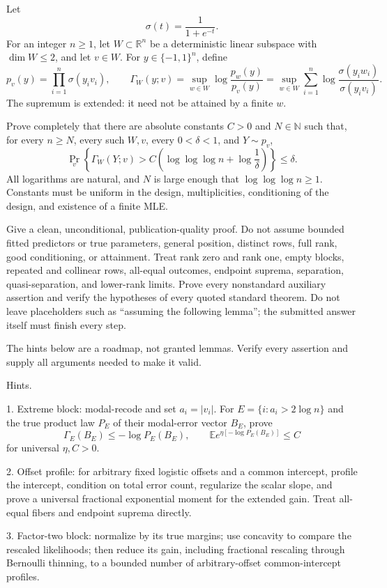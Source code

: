 \documentclass[11pt, letterpaper, hidelinks]{article}
\newcommand{\1}{\mathbf 1}
\let\subseteq\subset
\renewcommand{\le}{\leqslant}
\renewcommand{\ge}{\geqslant}
\theoremstyle{plain}
\theoremstyle{definition}
\begin{document}
\newpage
\begin{promptbox}
Let
\[
\sigma(t)=\frac1{1+e^{-t}}.
\]
For an integer \(n\ge1\), let \(W\subseteq\mathbb R^n\) be a deterministic linear
subspace with \(\dim W\le2\), and let \(v\in W\). For
\(y\in\{-1,1\}^n\), define
\[
p_v(y)=\prod_{i=1}^n\sigma(y_iv_i),\qquad
\Gamma_W(y;v)=\sup_{w\in W}\log\frac{p_w(y)}{p_v(y)}
=\sup_{w\in W}\sum_{i=1}^n
\log\frac{\sigma(y_iw_i)}{\sigma(y_iv_i)}.
\]
The supremum is extended: it need not be attained by a finite \(w\).

Prove completely that there are absolute constants \(C>0\) and \(N\in\mathbb N\)
such that, for every \(n\ge N\), every such \(W,v\), every \(0<\delta<1\), and
\(Y\sim p_v\),
\[
\Pr_v\!\left\{\Gamma_W(Y;v)>
C\left(\log\log\log n+\log\frac1\delta\right)\right\}\le\delta .
\]
All logarithms are natural, and \(N\) is large enough that
\(\log\log\log n\ge1\). Constants must be uniform in the design, multiplicities,
conditioning of the design, and existence of a finite MLE.

Give a clean, unconditional, publication-quality proof. Do not assume bounded fitted
predictors or true parameters, general position, distinct rows, full rank, good
conditioning, or attainment. Treat rank zero and rank one, empty blocks, repeated
and collinear rows, all-equal outcomes, endpoint suprema, separation,
quasi-separation, and lower-rank limits. Prove every nonstandard auxiliary assertion
and verify the hypotheses of every quoted standard theorem. Do not leave
placeholders such as “assuming the following lemma”; the submitted answer itself
must finish every step.

The hints below are a roadmap, not granted lemmas. Verify every assertion and supply
all arguments needed to make it valid.

Hints.

1. Extreme block: modal-recode and set \(a_i=|v_i|\). For
   \(E=\{i:a_i>2\log n\}\) and the true product law \(P_E\) of their modal-error
   vector \(B_E\), prove
   \[
   \Gamma_E(B_E)\le-\log P_E(B_E),\qquad
   \mathbb E e^{\eta[-\log P_E(B_E)]}\le C
   \]
   for universal \(\eta,C>0\).

2. Offset profile: for arbitrary fixed logistic offsets and a common intercept,
   profile the intercept, condition on total error count, regularize the scalar
   slope, and prove a universal fractional exponential moment for the extended
   gain. Treat all-equal fibers and endpoint suprema directly.

3. Factor-two block: normalize by its true margins; use concavity to compare the
   rescaled likelihoods; then reduce its gain, including fractional rescaling
   through Bernoulli thinning, to a bounded number of arbitrary-offset
   common-intercept profiles.


\end{promptbox}
\end{document}
